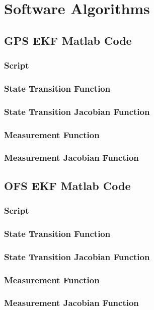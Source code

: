 \renewcommand*{\thepage}{B-\arabic{page}}
\chapter{Software Algorithms}
\section{GPS EKF Matlab Code}
\subsection{Script}


\subsection{State Transition Function}

\subsection{State Transition Jacobian Function}

\subsection{Measurement Function}

\subsection{Measurement Jacobian Function}


\section{OFS EKF Matlab Code}
\subsection{Script}
%
\subsection{State Transition Function}
%
\subsection{State Transition Jacobian Function}
%
\subsection{Measurement Function}
%
\subsection{Measurement Jacobian Function}
%



\clearpage
